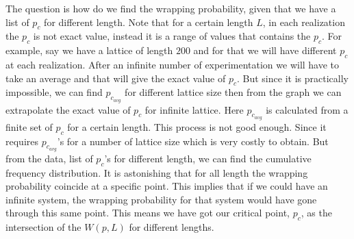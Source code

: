 	The question is how do we find the wrapping probability, given that we have a list of $p_c$ for different length. Note that for a certain length $L$, in each realization the $p_c$ is not exact value, instead it is a range of values that contains the $p_c$. For example, say we have a lattice of length $200$ and for that we will have different $p_c$ at each realization. After an infinite number of experimentation we will have to take an average and that will give the exact value of $p_c$. But since it is practically impossible, we can find $p_{c_{avg}}$ for different lattice size then from the graph we can extrapolate the exact value of $p_c$ for infinite lattice. Here $p_{c_{avg}}$ is calculated from a finite set of $p_c$ for a certain length. This process is not good enough. Since it requires  $p_{c_{avg}}$'s for a number of lattice size which is very costly to obtain. But from the data, list of $p_c$'s for different length, we can find the cumulative frequency distribution. It is astonishing  that for all length the wrapping probability coincide at a specific point. This implies that if we could have an infinite system, the wrapping probability for that system would have gone through this same point. This means we have got our critical point, $p_c$, as the intersection of the $W(p,L)$ for different lengths.
	
	\clearpage
	\newpage
